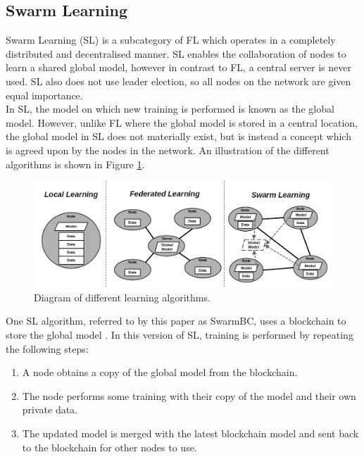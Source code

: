 \documentclass[letterpaper, 10 pt, conference]{ieeeconf}  %
\begin{document}
\subsection{Swarm Learning}
Swarm Learning (SL) is a subcategory of FL which operates in a completely distributed and decentralised manner. SL enables the collaboration of nodes to learn a shared global model, however in contrast to FL, a central server is never used. SL also does not use leader election, so all nodes on the network are given equal importance. \\

In SL, the model on which new training is performed is known as the global model. However, unlike FL where the global model is stored in a central location, the global model in SL does not materially exist, but is instead a concept which is agreed upon by the nodes in the network. An illustration of the different algorithms is shown in Figure \ref{fig_learning}. \\

\begin{figure}[h]
	\includegraphics[width=\linewidth]{fedvsswarm}
	\caption{Diagram of different learning algorithms.} \label{fig_learning}
\end{figure}

One SL algorithm, referred to by this paper as SwarmBC, uses a blockchain to store the global model \cite{swarm_learning}. In this version of SL, training is performed by repeating the following steps:
\begin{enumerate}
	\item A node obtains a copy of the global model from the blockchain.
	\item The node performs some training with their copy of the model and their own private data.
	\item The updated model is merged with the latest blockchain model and sent back to the blockchain for other nodes to use.
\end{enumerate}
\end{document}
